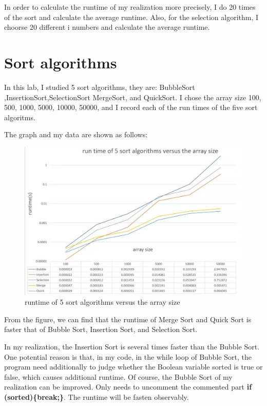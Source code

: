 \documentclass[12pt,a4paper]{article}
\theoremstyle{definition}
\begin{document}
In order to calculate the runtime of my realization more precisely, I do 20 times of the sort and calculate the average runtime. Also, for the selection algorithm, I choorse 20 different i numbers and calculate the average runtime.

\newpage
\section{Sort algorithms}

In this lab, I studied 5 sort algorithms, they are: BubbleSort ,InsertionSort,SelectionSort   MergeSort, and QuickSort. I chose the array size 100, 500, 1000, 5000, 10000, 50000, and I record each of the run times of the five sort algoritms.
 
The graph and my data are shown as follows:
\begin{figure}[ht]
	\centering
	\includegraphics[scale=0.32]{Lab03_1.jpg}
	\caption{runtime of 5 sort algorithms versus the array size}
\end{figure}

From the figure, we can find that the runtime of Merge Sort and Quick Sort is faster that of Bubble Sort, Insertion Sort, and Selection Sort.  

In my realization, the Insertion Sort is several times faster than the Bubble Sort. One potential reason is that, in my code, in the while loop of Bubble Sort, the program need additionally to judge whether the Boolean variable sorted is true or false, which causes additional runtime.  Of course, the Bubble Sort of my realization can be improved. Only needs to uncomment the commented part \textbf{if (sorted)\{break;\}}. The runtime will be fasten observably.
\end{document}
